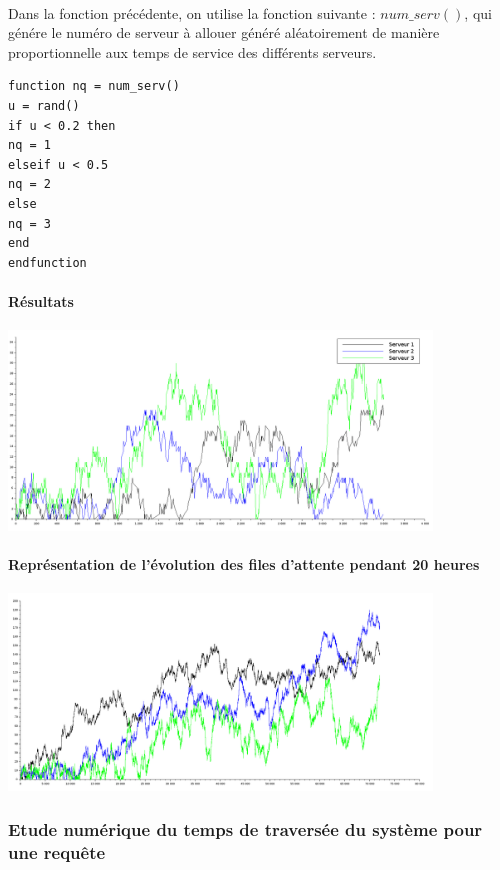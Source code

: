 \documentclass{article}
\begin{document}
\paragraph{}
Dans la fonction précédente, on utilise la fonction suivante : $num\_serv()$, qui génére le numéro de serveur à allouer généré aléatoirement de manière proportionnelle aux temps de service des différents serveurs.

\begin{verbatim}
function nq = num_serv()
u = rand()
if u < 0.2 then
nq = 1
elseif u < 0.5
nq = 2
else
nq = 3
end
endfunction
\end{verbatim}

\paragraph{Résultats}
\begin{center}
	\includegraphics[width=425px]{img/aleaProp.png}
\end{center}

\paragraph{Représentation de l'évolution des files d'attente pendant 20 heures}
\begin{center}
	\includegraphics[width=425px]{img/alea20h.png}
\end{center}

\subsubsection{Etude numérique du temps de traversée du système pour une requête}
\end{document}

